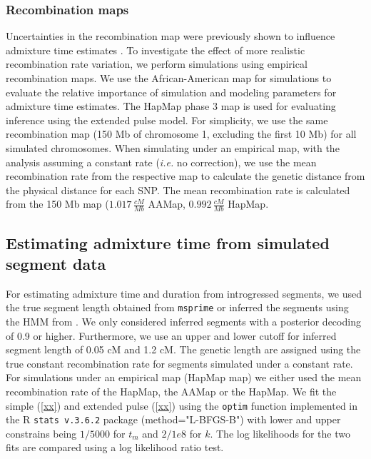 \documentclass[11pt]{article}
\begin{document}
\subsubsection{Recombination maps}\label{recombination map}
Uncertainties in the recombination map were previously shown to influence admixture time estimates \citep{sankararaman_date_2012,fu_genome_2014,sankararaman_combined_2016}. To investigate the effect of more realistic
recombination rate variation, we perform simulations using empirical recombination maps. We use the  African-American map \citep{hinch_landscape_2011} for simulations to evaluate the relative importance of simulation and modeling parameters for admixture time estimates. The HapMap phase 3 map \citep{HapMapConsortium_second_2007} is used for evaluating inference using the extended pulse model. For simplicity, we use the same
recombination map (150 Mb of chromosome 1, excluding the first 10 Mb)
for all simulated chromosomes. When simulating under an empirical map, with the analysis assuming a constant rate (\emph{i.e.} no correction), we use the mean recombination rate from the respective map to calculate the genetic distance from the physical distance for each SNP. The mean recombination rate is
calculated from the 150 Mb map (\(1.017 \, \frac{cM}{Mb}\) AAMap,
\(0.992 \, \frac{cM}{Mb}\) HapMap.

\subsection{Estimating admixture time from simulated segment data}\label{Estimating admixture time from simulated segment data}

For estimating admixture time and duration from introgressed segments, we used the true segment length obtained from \texttt{msprime} or inferred the segments using the HMM from \cite{skov_detecting_2018}. We only considered inferred segments with a posterior decoding of 0.9 or higher. Furthermore, we use an upper and lower cutoff for inferred segment length of 0.05 cM and 1.2 cM. The genetic length are assigned using the true constant recombination rate for segments simulated under a constant rate. For simulations under an empirical map (HapMap map) we either used the mean recombination rate of the HapMap, the AAMap or the HapMap.
We fit the simple (\ref{xx}) and extended pulse (\ref{xx}) using the \texttt{optim} function implemented in the R \texttt{stats v.3.6.2} package (method="L-BFGS-B") with lower and upper constrains being $1/5000$ for $t_m$ and $2/1e8$ for $k$. The log likelihoods for the two fits are compared using a log likelihood ratio test.
\end{document}

